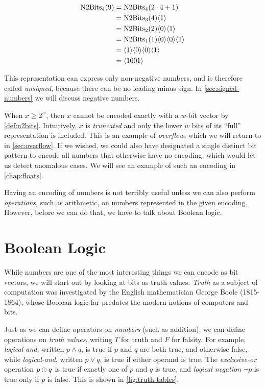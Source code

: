   \begin{example}
\begin{align}
  \mathrm{N2Bits}_{4}(9) &= \mathrm{N2Bits}_{4}(2\cdot{}4 + 1) \\
            &= \mathrm{N2Bits}_{3}(4) \langle 1 \rangle \\
            &= \mathrm{N2Bits}_{2}(2) \langle 0 \rangle \langle 1 \rangle \\
            &= \mathrm{N2Bits}_{1}(1) \langle 0 \rangle \langle 0 \rangle \langle 1 \rangle \\
            &= \langle 1 \rangle \langle 0 \rangle \langle 0 \rangle \langle 1 \rangle \\
            &= \langle 1001 \rangle
\end{align}
  \end{example}

This representation can express only non-negative numbers, and is
therefore called \emph{unsigned}, because there can be no leading
minus sign. In \cref{sec:signed-numbers} we will discuss negative
numbers.

When $x \geq 2^{w}$, then $x$ cannot be encoded exactly with a $w$-bit
vector by \cref{def:n2bits}. Intuitively, $x$ is \emph{truncated} and
only the lower $w$ bits of its ``full'' representation is included.
This is an example of \emph{overflow}, which we will return to in
\cref{sec:overflow}. If we wished, we could also have designated a
single distinct bit pattern to encode all numbers that otherwise have
no encoding, which would let us detect anomalous cases. We will see an
example of such an encoding in \cref{chap:floats}.

Having an encoding of numbers is not terribly useful unless we can
also perform \emph{operations}, such as arithmetic, on numbers
represented in the given encoding.  However, before we can do that,
we have to talk about Boolean logic.

\section{Boolean Logic}
\label{sec:boolean-logic}

While numbers are one of the most interesting things we can encode as
bit vectors, we will start out by looking at bits as truth values.
\emph{Truth} as a subject of computation was investigated by the
English mathematician George Boole (1815-1864), whose Boolean logic
far predates the modern notions of computers and bits.

Just as we can define operators on \emph{numbers} (such as addition),
we can define operations on \emph{truth values}, writing $T$ for truth
and $F$ for falsity.  For example, \emph{logical-and}, written
$p \land q$, is true if $p$ and $q$ are both true, and otherwise
false, while \emph{logical-and}, written $p \lor q$, is true if either
operand is true.  The \emph{exclusive-or} operation $p \oplus q$ is
true if exactly one of $p$ and $q$ is true, and \emph{logical
  negation} $\neg p$ is true only if $p$ is false.  This is shown in
\cref{fig:truth-tables}.

